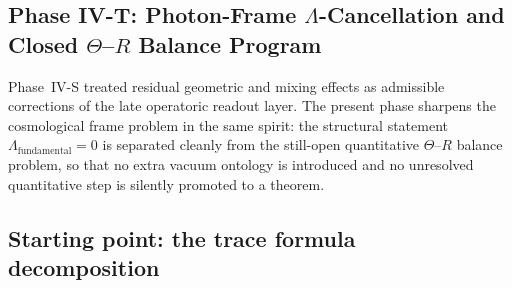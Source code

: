 


\subsection*{Phase IV-T: Photon-Frame $\Lambda$-Cancellation and Closed $\Theta$--$R$ Balance Program}
\label{sec:lambda_cancel}

\begin{remark}\label{rem:transition_s_to_t_closed}
Phase~IV-S treated residual geometric and mixing effects as admissible corrections of the late operatoric readout layer. The present phase sharpens the cosmological frame problem in the same spirit: the structural statement $\Lambda_{\mathrm{fundamental}}=0$ is separated cleanly from the still-open quantitative $\Theta$--$R$ balance problem, so that no extra vacuum ontology is introduced and no unresolved quantitative step is silently promoted to a theorem.
\end{remark}

\subsection{Starting point: the trace formula decomposition}

